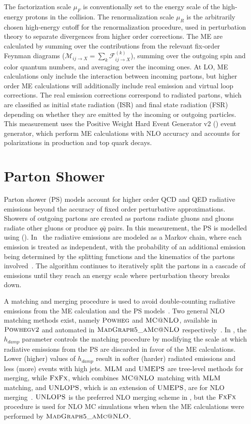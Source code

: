 The factorization scale $\mu_F$ is conventionally set to the energy scale of the high-energy protons in the collision.
The renormalization scale $\mu_R$ is the arbitrarily chosen high-energy cutoff for the renormalization procedure, used in perturbation theory to separate divergences from higher order corrections.
The ME are calculated by summing over the contributions from the relevant fix-order Feynman diagrams ($\mathcal{M}_{i j \rightarrow X}=\sum_k \mathcal{F}_{i j \rightarrow X}^{(k)}$), summing over the outgoing spin and color quantum numbers, and averaging over the incoming ones.
At LO, ME calculations only include the interaction between incoming partons, but higher order ME calculations will additionally include real emission and virtual loop corrections.
The real emission corrections correspond to radiated partons, which are classified as initial state radiation (ISR) and final state radiation (FSR) depending on whether they are emitted by the incoming or outgoing particles.
This measurement uses the Positive Weight Hard Event Generator v2 (\Powheg) event generator, which perform ME calculations with NLO accuracy and accounts for polarizations in \ttbar production and top quark decays.

\section{Parton Shower}
Parton shower (PS) models account for higher order QCD and QED radiative emissions beyond the accuracy of fixed order perturbative approximations.
Showers of outgoing partons are created as partons radiate gluons and gluons radiate other gluons or produce $q\bar{q}$ pairs.
In this measurement, the PS is modelled using (\Pythia).
In \Pythia\ the radiative emissions are modeled as a Markov chain, where each emission is treated as independent, with the probability of an additional emission being determined by the splitting functions and the kinematics of the partons involved~\cite{pythia8.3}.
The algorithm continues to iteratively split the partons in a cascade of emissions until they reach an energy scale where perturbation theory breaks down.

A matching and merging procedure is used to avoid double-counting radiative emissions from the ME calculation and the PS models~\cite{StefanoFrixione_2007}.
Two general NLO matching methods exist, namely $\textsc{Powheg}$ and $\textsc{MC@NLO}$, available in ${\textsc{Powhegv2}}$ and automated in $\textsc{MadGraph5\_aMc@NLO}$ respectively~\cite{pythia8.3}.
In \Powheg, the $h_{damp}$ parameter controls the matching procedure by modifying the scale at which radiative emissions from the PS are discarded in favor of the ME calculations.
Lower (higher) values of $h_{damp}$ result in softer (harder) radiated emissions and less (more) events with high \pT jets.
$\textsc{MLM}$ and $\textsc{UMEPS}$ are tree-level methods for merging, while $\textsc{FxFx}$, which combines $\textsc{MC@NLO}$ matching with $\textsc{MLM}$ matching, and $\textsc{UNLOPS}$, which is an extension of $\textsc{UMEPS}$, are for NLO merging~\cite{pythia8.3}.
$\textsc{UNLOPS}$ is the preferred NLO merging scheme in \Pythia, but the $\textsc{FxFx}$ procedure is used for NLO MC simulations when when the ME calculations were performed by $\textsc{MadGraph5\_aMc@NLO}$.

